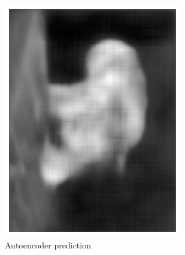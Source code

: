 \documentclass{l4proj}
\begin{document}
\begin{figure}[ht]
\begin{subfigure}[h!]{0.22\textwidth}
    \includegraphics[width=\textwidth]{images/autoencoder/train/auto.png}
    \caption{Autoencoder prediction}
    \label{fig:autoencoder_pony_train_autoencoder}
  \end{subfigure}
  \begin{subfigure}[h!]{0.22\textwidth}

\end{subfigure}
\end{figure}
\end{document}
